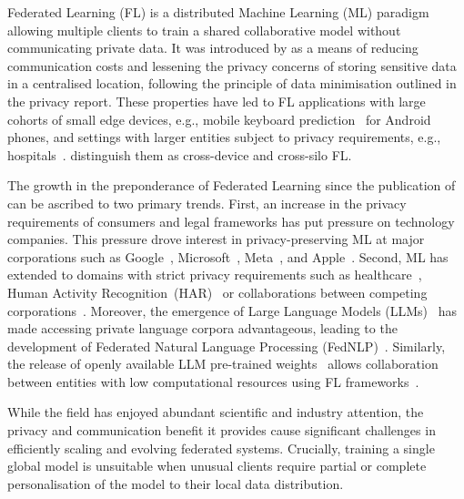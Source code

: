 
Federated Learning (FL) is a distributed Machine Learning (ML) paradigm allowing multiple clients to train a shared collaborative model without communicating private data. It was introduced by \citet{FedAvg} as a means of reducing communication costs and lessening the privacy concerns of storing sensitive data in a centralised location, following the principle of data minimisation outlined in the \citet{White_House_Report} privacy report. These properties have led to FL applications with large cohorts of small edge devices, e.g., mobile keyboard prediction~\citep{GoogleKeyboard} for Android phones, and settings with larger entities subject to privacy requirements, e.g., hospitals~\citep{FLmedicine}. \citet{AdvancedAndOpenProblems} distinguish them as cross-device and cross-silo FL\@.

The growth in the preponderance of Federated Learning since the publication of \citet{FedAvg} can be ascribed to two primary trends. First, an increase in the privacy requirements of consumers and legal frameworks has put pressure on technology companies. This pressure drove interest in privacy-preserving ML at major corporations such as Google~\citep{FedAvg,GoogleKeyboard,tensorflowfederated,PracticalPrivateFLkairouz21b}, Microsoft~\citep{FLINT,Flute}, Meta~\citep{PAPAYA,FedBuff}, and Apple~\citep{AppleFL}. Second, ML has extended to domains with strict privacy requirements such as healthcare~\citep{FLmedicine,FutureOfHealth,BigDataCancer}, Human Activity Recognition~(HAR)~\citep{HARusingFL_2018,ClusterFL} or collaborations between competing corporations~\citep{SustainableIncentive,TowardsFairPrivacyPreservingFL}. Moreover, the emergence of Large Language Models (LLMs)~\citep{OpportunitiesAndRisksLLM} has made accessing private language corpora advantageous, leading to the development of Federated Natural Language Processing (FedNLP)~\citep{FedNLP}. Similarly, the release of openly available LLM pre-trained weights~\citep{LLaMA} allows collaboration between entities with low computational resources using FL frameworks~\citep{Flower,FedScale,FedML}.

While the field has enjoyed abundant scientific and industry attention, the privacy and communication benefit it provides cause significant challenges in efficiently scaling and evolving federated systems. Crucially, training a single global model is unsuitable when unusual clients require partial or complete personalisation of the model to their local data distribution.

